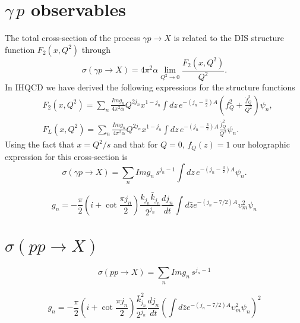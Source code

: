 \documentclass[preprint, 12pt]{elsarticle}
\begin{document}
\section{$\gamma\, p$ observables}

The total cross-section of the process $\gamma p \rightarrow X$ is related to the DIS structure function $F_2\left(x, Q^2\right)$ through
\begin{equation}
\sigma\left(\gamma p \rightarrow X\right) = 4 \pi^2 \alpha \lim_{Q^2 \rightarrow 0} \frac{F_2\left(x, Q^2\right)}{Q^2}.
\end{equation}
In IHQCD we have derived the following expressions for the structure functions
\begin{align}
&F_2(x, Q^2) = \sum_{n} \frac{ Im g_n}{4 \pi^2 \alpha} Q^{2 j_n} x^{1-j_n} \int dz \,e^{-\left(j_n-\frac{3}{2}\right)A}  \left( f_Q^2  +  \frac{\dot{f}_Q^{2}}{Q^2}      \right) \psi_n , \\
&F_L(x, Q^2) = \sum_{n} \frac{Im g_n}{4 \pi^2 \alpha} Q^{2 j_n} x^{1-j_n} \int dz \,e^{-\left(j_n-\frac{3}{2}\right)A}  \frac{\dot{f}_Q^{2}}{Q^2}  \psi_n.
\end{align}
Using the fact that $x = Q^2 / s$ and that for $Q = 0, \, f_Q\left(z\right) = 1$ our holographic expression for this cross-section is
\begin{equation}
\sigma\left(\gamma p \rightarrow X\right) =  \sum_{n} Im g_n \, s^{j_n -1 } \int dz \,e^{-\left(j_n-\frac{3}{2}\right)A}  \psi_n.
\end{equation}

\begin{equation}
g_n = - \frac{\pi}{2} \left( i + \cot \frac{\pi j_n}{2} \right) \frac{k_{j_n} \bar{k}_{j_n}}{2^{j_n}} \frac{d j_n}{dt} \int d\bar{z} e^{-\left(j_n - 7/2 \right)A} \upsilon_m^2 \psi_n
\end{equation}

\section{$\sigma\left(p p \rightarrow X\right)$}

\begin{equation}
\sigma\left(p p \rightarrow X\right) = \sum_n Im g_n \, s^{j_n -1}
\end{equation}

\begin{equation}
g_n = - \frac{\pi}{2} \left( i + \cot \frac{\pi j_n}{2} \right) \frac{\bar{k}^2_{j_n}}{2^{j_n}} \frac{d j_n}{dt} {\left(\int d\bar{z} e^{-\left(j_n - 7/2 \right)A} \upsilon_m^2 \psi_n\right)}^2
\end{equation}
\end{document}
